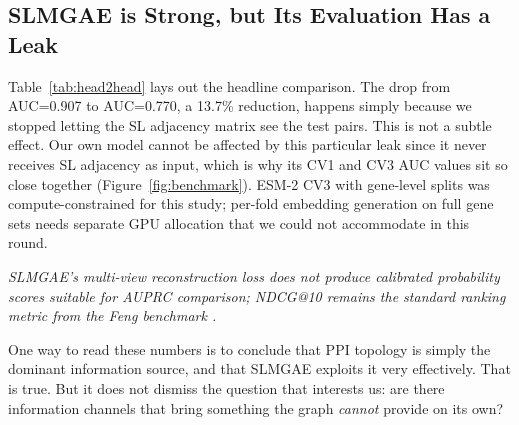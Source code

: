 \documentclass[12pt,a4paper]{article}
\begin{document}
\subsection{SLMGAE is Strong, but Its Evaluation Has a Leak}

\begin{table}[ht]
\centering
\caption{Cold-start performance comparison on identical data}
\label{tab:head2head}
\end{table}

Table~\ref{tab:head2head} lays out the headline comparison. The drop from AUC=0.907 to AUC=0.770, a 13.7\% reduction, happens simply because we stopped letting the SL adjacency matrix see the test pairs. This is not a subtle effect. Our own model cannot be affected by this particular leak since it never receives SL adjacency as input, which is why its CV1 and CV3 AUC values sit so close together (Figure~\ref{fig:benchmark}). ESM-2 CV3 with gene-level splits was compute-constrained for this study; per-fold embedding generation on full gene sets needs separate GPU allocation that we could not accommodate in this round.

\textit{SLMGAE's multi-view reconstruction loss does not produce calibrated probability scores suitable for AUPRC comparison; NDCG@10 remains the standard ranking metric from the Feng benchmark \cite{feng2024}.}

One way to read these numbers is to conclude that PPI topology is simply the dominant information source, and that SLMGAE exploits it very effectively. That is true. But it does not dismiss the question that interests us: are there information channels that bring something the graph \textit{cannot} provide on its own?
\end{document}

